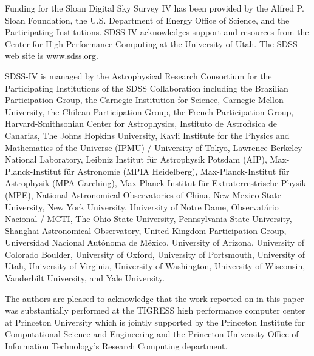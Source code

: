 \documentclass[modern, letterpaper]{aastex62}
\begin{document}
Funding for the Sloan Digital Sky Survey IV has been provided by the Alfred P. Sloan Foundation, the U.S. Department of Energy Office of Science, and the Participating Institutions. SDSS-IV acknowledges
support and resources from the Center for High-Performance Computing at
the University of Utah. The SDSS web site is www.sdss.org.

SDSS-IV is managed by the Astrophysical Research Consortium for the
Participating Institutions of the SDSS Collaboration including the
Brazilian Participation Group, the Carnegie Institution for Science,
Carnegie Mellon University, the Chilean Participation Group, the French Participation Group, Harvard-Smithsonian Center for Astrophysics,
Instituto de Astrof\'isica de Canarias, The Johns Hopkins University,
Kavli Institute for the Physics and Mathematics of the Universe (IPMU) /
University of Tokyo, Lawrence Berkeley National Laboratory,
Leibniz Institut f\"ur Astrophysik Potsdam (AIP),
Max-Planck-Institut f\"ur Astronomie (MPIA Heidelberg),
Max-Planck-Institut f\"ur Astrophysik (MPA Garching),
Max-Planck-Institut f\"ur Extraterrestrische Physik (MPE),
National Astronomical Observatories of China, New Mexico State University,
New York University, University of Notre Dame,
Observat\'ario Nacional / MCTI, The Ohio State University,
Pennsylvania State University, Shanghai Astronomical Observatory,
United Kingdom Participation Group,
Universidad Nacional Aut\'onoma de M\'exico, University of Arizona,
University of Colorado Boulder, University of Oxford, University of Portsmouth,
University of Utah, University of Virginia, University of Washington, University of Wisconsin,
Vanderbilt University, and Yale University.

The authors are pleased to acknowledge that the work reported on in this
paper was substantially performed at the TIGRESS high performance computer
center at Princeton University which is jointly supported by the Princeton
Institute for Computational Science and Engineering and the Princeton
University Office of Information Technology's Research Computing department.

\end{document}
